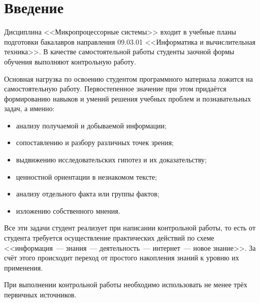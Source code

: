 \documentclass[main.tex]{subfiles}
\begin{document}
\chapter*{Введение}

Дисциплина <<Микропроцессорные системы>> входит в учебные планы подготовки бакалавров направления 09.03.01 <<Информатика и вычислительная техника>>. В качестве самостоятельной работы студенты заочной формы обучения выполняют контрольную работу.

Основная нагрузка по освоению студентом программного материала ложится на самостоятельную работу. Первостепенное значение при этом придаётся формированию навыков и умений решения учебных проблем и познавательных задач, а именно:

\begin{itemize}
\item анализу получаемой и добываемой информации;
\item сопоставлению и разбору различных точек зрения;
\item выдвижению исследовательских гипотез и их доказательству;
\item ценностной ориентации в незнакомом тексте;
\item анализу отдельного факта или группы фактов;
\item изложению собственного мнения.
\end{itemize}

Все эти задачи студент реализует при написании контрольной работы, то есть от студента требуется осуществление практических действий по схеме <<информация~--- знания~--- деятельность~--- интернет~--- новое знание>>. За счёт этого происходит переход от простого накопления знаний к уровню их применения.

При выполнении контрольной работы необходимо использовать не менее трёх первичных источников.
\end{document}

